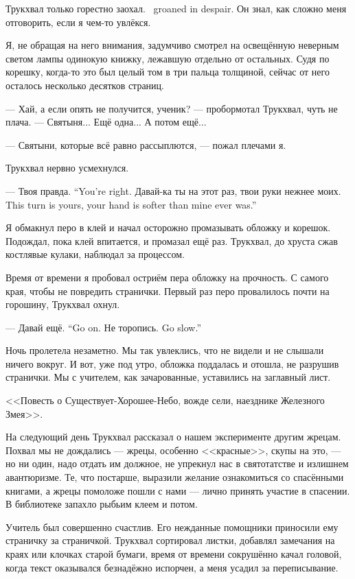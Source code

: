 {Трукхвал только горестно заохал.}
{\Trukchual\ groaned in despair.}
Он знал, как сложно меня отговорить, если я чем-то увлёкся.

Я, не обращая на него внимания, задумчиво смотрел на освещённую неверным светом лампы одинокую книжку, лежавшую отдельно от остальных.
Судя по корешку, когда-то это был целый том в три пальца толщиной, сейчас от него осталось несколько десятков страниц.

--- Хай, а если опять не получится, ученик? --- пробормотал Трукхвал, чуть не плача.
--- Святыня...
Ещё одна...
А потом ещё...

--- Святыни, которые всё равно рассыплются, --- пожал плечами я.

Трукхвал нервно усмехнулся.

{--- Твоя правда.}
{``You're right.}
{Давай-ка ты на этот раз, твои руки нежнее моих.}
{This turn is yours, your hand is softer than mine ever was.''}

Я обмакнул перо в клей и начал осторожно промазывать обложку и корешок.
Подождал, пока клей впитается, и промазал ещё раз.
Трукхвал, до хруста сжав костлявые кулаки, наблюдал за процессом.

Время от времени я пробовал остриём пера обложку на прочность.
С самого края, чтобы не повредить странички.
Первый раз перо провалилось почти на горошину, Трукхвал охнул.

{--- Давай ещё.}
{``Go on.}
{Не торопись.}
{Go slow.''}

Ночь пролетела незаметно.
Мы так увлеклись, что не видели и не слышали ничего вокруг.
И вот, уже под утро, обложка поддалась и отошла, не разрушив странички.
Мы с учителем, как зачарованные, уставились на заглавный лист.

<<Повесть о Существует-Хорошее-Небо, вожде сели, наезднике Железного Змея>>.

\asterism

На следующий день Трукхвал рассказал о нашем эксперименте другим жрецам.
Похвал мы не дождались --- жрецы, особенно <<красные>>, скупы на это, --- но ни один, надо отдать им должное, не упрекнул нас в святотатстве и излишнем авантюризме.
Те, что постарше, выразили желание ознакомиться со спасёнными книгами, а жрецы помоложе пошли с нами --- лично принять участие в спасении.
В библиотеке запахло рыбьим клеем и потом.

Учитель был совершенно счастлив.
Его нежданные помощники приносили ему страничку за страничкой.
Трукхвал сортировал листки, добавлял замечания на краях или клочках старой бумаги, время от времени сокрушённо качал головой, когда текст оказывался безнадёжно испорчен, а меня усадил за переписывание.

